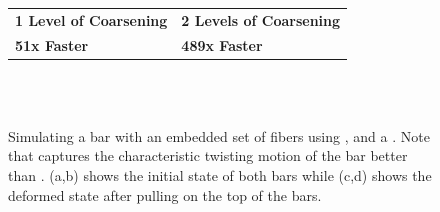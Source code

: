 \begin{figure}
	\centering
	\begin{tabularx}{0.92\columnwidth}{ Y Y }
		\textbf{1 Level of Coarsening} & \textbf{\textbf{2 Levels of Coarsening}} \\
		\textbf{51x Faster} & \textbf{489x Faster}
	\end{tabularx}\\
	  \\

	\vspace{-2pt}
	\caption{Simulating a bar with an embedded set of fibers using {\Naive}, {\DDFEM} and a {\HiRes}. Note that {\DDFEM} captures the characteristic twisting motion of the bar better than {\Naive}.  (a,b) shows the initial state of both bars while (c,d) shows the deformed state after pulling on the top of the bars.}
	\label{fig:fiberPull}
\end{figure}
